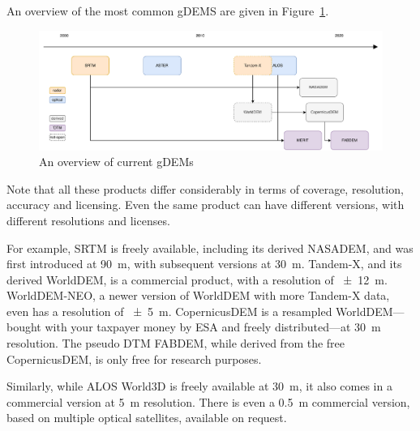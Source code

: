 An overview of the most common gDEMS are given in Figure~\ref{fig:gdem_inheritance}.
\begin{figure} %
  \centering
  \includegraphics[width=\linewidth]{dems_overview}
  \caption{An overview of current gDEMs}%
\label{fig:gdem_inheritance}
\end{figure}
Note that all these products differ considerably in terms of coverage, resolution, accuracy and licensing.
Even the same product can have different versions, with different resolutions and licenses.

For example, SRTM is freely available, including its derived NASADEM, and was first introduced at \qty{90}{m}, with subsequent versions at \qty{30}{m}.
Tandem-X, and its derived WorldDEM, is a commercial product, with a resolution of \qty{\pm12}{m}.
WorldDEM-NEO, a newer version of WorldDEM with more Tandem-X data, even has a resolution of \qty{\pm5}{m}.
CopernicusDEM is a resampled WorldDEM---bought with your taxpayer money by ESA and freely distributed---at \qty{30}{m} resolution.
The pseudo DTM FABDEM, while derived from the free CopernicusDEM, is only free for research purposes.

Similarly, while ALOS World3D is freely available at \qty{30}{m}, it also comes in a commercial version at \qty{5}{m} resolution.
There is even a \qty{0.5}{m} commercial version, based on multiple optical satellites, available on request.




